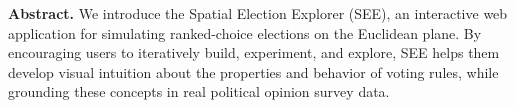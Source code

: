 \noindent
\textbf{Abstract.}
We introduce the Spatial Election Explorer (SEE),
an interactive web application for simulating ranked-choice elections on the Euclidean plane.
By encouraging users to iteratively build, experiment, and explore,
SEE helps them develop visual intuition about the properties and behavior of voting rules,
while grounding these concepts in real political opinion survey data.
